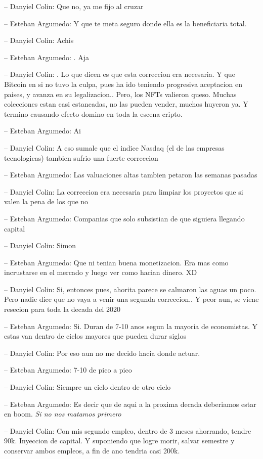 -- Danyiel Colin: Que no, ya me fijo al cruzar

-- Esteban Argumedo: Y que te meta seguro donde ella es la beneficiaria
total.

-- Danyiel Colin: Achis

-- Esteban Argumedo: . Aja

-- Danyiel Colin: . Lo que dicen es que esta correccion era necesaria. Y
que Bitcoin en si no tuvo la culpa, pues ha ido teniendo progresiva
aceptacion en paises, y avanza en su legalizacion.. Pero, los NFTs
valieron queso. Muchas colecciones estan casi estancadas, no las pueden
vender, muchos huyeron ya. Y termino causando efecto domino en toda la
escena cripto.

-- Esteban Argumedo: Ai

-- Danyiel Colin: A eso sumale que el indice Nasdaq (el de las empresas
tecnologicas) tambien sufrio una fuerte correccion

-- Esteban Argumedo: Las valuaciones altas tambien petaron las semanas
pasadas

-- Danyiel Colin: La correccion era necesaria para limpiar los proyectos
que si valen la pena de los que no

-- Esteban Argumedo: Companias que solo subsistian de que siguiera
llegando capital

-- Danyiel Colin: Simon

-- Esteban Argumedo: Que ni tenian buena monetizacion. Era mas como
incrustarse en el mercado y luego ver como hacian dinero. XD

-- Danyiel Colin: Si, entonces pues, ahorita parece se calmaron las
aguas un poco. Pero nadie dice que no vaya a venir una segunda
correccion.. Y peor aun, se viene resecion para toda la decada del 2020

-- Esteban Argumedo: Si. Duran de 7-10 anos segun la mayoria de
economistas. Y estas van dentro de ciclos mayores que pueden durar
siglos

-- Danyiel Colin: Por eso aun no me decido hacia donde actuar.

-- Esteban Argumedo: 7-10 de pico a pico

-- Danyiel Colin: Siempre un ciclo dentro de otro ciclo

-- Esteban Argumedo: Es decir que de aqui a la proxima decada deberiamos
estar en boom. \emph{Si no nos matamos primero}

-- Danyiel Colin: Con mis segundo empleo, dentro de 3 meses ahorrando,
tendre 90k. Inyeccion de capital. Y suponiendo que logre morir, salvar
semestre y conservar ambos empleos, a fin de ano tendria casi 200k.

